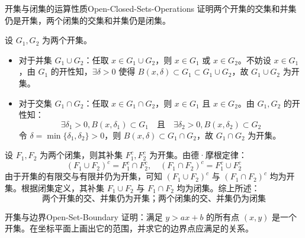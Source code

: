 \begin{problem}{开集与闭集的运算性质}{Open-Closed-Sets-Operations}
    证明两个开集的交集和并集仍是开集，两个闭集的交集和并集仍是闭集。
\end{problem}

\begin{myproof}
    设 $G_1, G_2$ 为两个开集。
    \begin{itemize}
        \item 对于并集 $G_1 \cup G_2$：任取 $x \in G_1 \cup G_2$，则 $x \in G_1$ 或 $x \in G_2$。不妨设 $x \in G_1$，由 $G_1$ 的开性知，$\exists \delta > 0$ 使得 $B(x, \delta) \subset G_1 \subset G_1 \cup G_2$，故 $G_1 \cup G_2$ 为开集。
        \item 对于交集 $G_1 \cap G_2$：任取 $x \in G_1 \cap G_2$，则 $x \in G_1$ 且 $x \in G_2$。由 $G_1, G_2$ 的开性知：
              \begin{equation*}
                  \exists \delta_1 > 0, B(x, \delta_1) \subset G_1 \quad \text{且} \quad \exists \delta_2 > 0, B(x, \delta_2) \subset G_2
              \end{equation*}
              令 $\delta = \min\{\delta_1, \delta_2\} > 0$，则 $B(x, \delta) \subset G_1 \cap G_2$，故 $G_1 \cap G_2$ 为开集。
    \end{itemize}
    设 $F_1, F_2$ 为两个闭集，则其补集 $F_1^c, F_2^c$ 为开集。由德·摩根定律：
    \begin{equation*}
        (F_1 \cup F_2)^c = F_1^c \cap F_2^c, \quad (F_1 \cap F_2)^c = F_1^c \cup F_2^c
    \end{equation*}
    由于开集的有限交与有限并仍为开集，可知 $(F_1 \cup F_2)^c$ 与 $(F_1 \cap F_2)^c$ 均为开集。根据闭集定义，其补集 $F_1 \cup F_2$ 与 $F_1 \cap F_2$ 均为闭集。综上所述：
    \begin{equation*}
        \boxed{\text{两个开集的交、并集仍为开集；两个闭集的交、并集仍为闭集}}
    \end{equation*}
\end{myproof}


\begin{problem}{开集与边界}{Open-Set-Boundary}
    证明：满足 $y > ax + b$ 的所有点 $(x, y)$ 是一个开集。在坐标平面上画出它的范围，并求它的边界点应满足的关系。
\end{problem}

